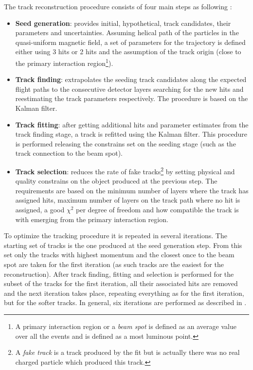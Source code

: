 The track reconstruction procedure consists of four main steps as following \cite{Chatrchyan:2014fea}:

\begin{itemize}
 \item \textbf{Seed generation}: provides initial, hypothetical, track candidates, their parameters and uncertainties. Assuming helical path of the particles in the
 quasi-uniform magnetic field, a set of parameters for the trajectory is defined either using 3 hits or 2 hits and the assumption
 of the track origin (close to the primary interaction region\footnote{A primary interaction region or a \textit{beam spot} is defined 
 as an average value over all the events and is defined as a most luminous point.}).
 \item \textbf{Track finding}: extrapolates the seeding track candidates along the expected flight paths to the consecutive detector layers searching 
 for the new hits and reestimating the track parameters respectively. The procedure is based on the Kalman filter\cite{Fruhwirth:1987fm}.
 \item \textbf{Track fitting}: after getting additional hits and parameter estimates from the track finding stage, a track is refitted using the 
 Kalman filter. This procedure is performed releasing the constrains set on the seeding stage (such as the track connection to the beam spot).
 \item \textbf{Track selection}: reduces the rate of fake tracks\footnote{A \textit{fake track} is a track produced by the fit but is actually there was
 no real charged particle which produced this track.} by setting physical and quality constrains on the object produced at the previous step. The requirements
 are based on the minimum number of layers where the track has assigned hits, maximum number of layers on the track path where no hit is assigned,
 a good $\chi^{2}$ per degree of freedom and how compatible the track is with emerging from the primary interaction region.
\end{itemize}

To optimize the tracking procedure it is repeated in several iterations. The starting set of tracks is the one produced at the seed generation step.
From this set only the tracks with highest momentum and the closest once to the beam spot are taken for the first iteration (as such tracks are the
easiest for the reconstruction). After track finding, fitting and selection is performed for the subset of the tracks for the first iteration, all their
associated hits are removed and the next iteration takes place, repeating everything as for the first iteration, but for the softer tracks. In general,
six iterations are performed as described in \cite{Chatrchyan:2014fea}.

